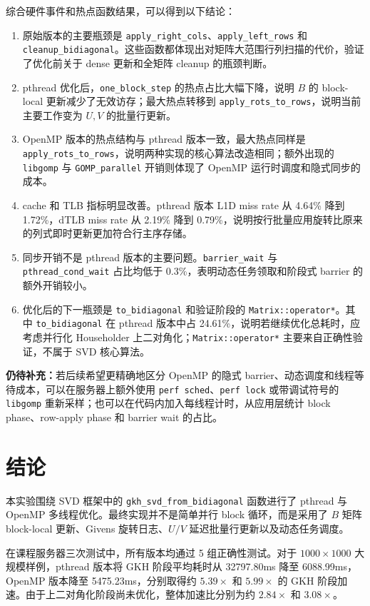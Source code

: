 ﻿\documentclass[UTF8,a4paper]{ctexart}
\begin{document}
综合硬件事件和热点函数结果，可以得到以下结论：

\begin{enumerate}
  \item 原始版本的主要瓶颈是 \texttt{apply\_right\_cols}、\texttt{apply\_left\_rows} 和 \texttt{cleanup\_bidiagonal}。这些函数都体现出对矩阵大范围行列扫描的代价，验证了优化前关于 dense 更新和全矩阵 cleanup 的瓶颈判断。
  \item pthread 优化后，\texttt{one\_block\_step} 的热点占比大幅下降，说明 $B$ 的 block-local 更新减少了无效访存；最大热点转移到 \texttt{apply\_rots\_to\_rows}，说明当前主要工作变为 $U,V$ 的批量行更新。
  \item OpenMP 版本的热点结构与 pthread 版本一致，最大热点同样是 \texttt{apply\_rots\_to\_rows}，说明两种实现的核心算法改造相同；额外出现的 \texttt{libgomp} 与 \texttt{GOMP\_parallel} 开销则体现了 OpenMP 运行时调度和隐式同步的成本。
  \item cache 和 TLB 指标明显改善。pthread 版本 L1D miss rate 从 4.64\% 降到 1.72\%，dTLB miss rate 从 2.19\% 降到 0.79\%，说明按行批量应用旋转比原来的列式即时更新更加符合行主序存储。
  \item 同步开销不是 pthread 版本的主要问题。\texttt{barrier\_wait} 与 \texttt{pthread\_cond\_wait} 占比均低于 0.3\%，表明动态任务领取和阶段式 barrier 的额外开销较小。
  \item 优化后的下一瓶颈是 \texttt{to\_bidiagonal} 和验证阶段的 \texttt{Matrix::operator*}。其中 \texttt{to\_bidiagonal} 在 pthread 版本中占 24.61\%，说明若继续优化总耗时，应考虑并行化 Householder 上二对角化；\texttt{Matrix::operator*} 主要来自正确性验证，不属于 SVD 核心算法。
\end{enumerate}

\textbf{仍待补充：}若后续希望更精确地区分 OpenMP 的隐式 barrier、动态调度和线程等待成本，可以在服务器上额外使用 \texttt{perf sched}、\texttt{perf lock} 或带调试符号的 \texttt{libgomp} 重新采样；也可以在代码内加入每线程计时，从应用层统计 block phase、row-apply phase 和 barrier wait 的占比。

\section{结论}

本实验围绕 SVD 框架中的 \texttt{gkh\_svd\_from\_bidiagonal} 函数进行了 pthread 与 OpenMP 多线程优化。最终实现并不是简单并行 block 循环，而是采用了 $B$ 矩阵 block-local 更新、Givens 旋转日志、$U/V$ 延迟批量行更新以及动态任务调度。

在课程服务器三次测试中，所有版本均通过 5 组正确性测试。对于 $1000\times1000$ 大规模样例，pthread 版本将 GKH 阶段平均耗时从 32797.80ms 降至 6088.99ms，OpenMP 版本降至 5475.23ms，分别取得约 $5.39\times$ 和 $5.99\times$ 的 GKH 阶段加速。由于上二对角化阶段尚未优化，整体加速比分别为约 $2.84\times$ 和 $3.08\times$。
\end{document}
